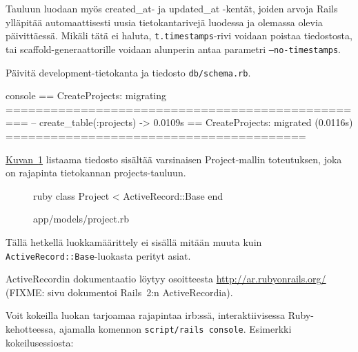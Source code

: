 \documentclass{article}
\newenvironment{myfigure}[1][tbp]{
  \begin{figure}[#1]
    \centering
    \begin{lrbox}{\myfigurebox}
      \begin{minipage}{\textwidth}
}{
      \end{minipage}
    \end{lrbox}
    \colorbox{blue!4}{\usebox{\myfigurebox}}
  \end{figure}
}
\newcommand{\myref}[2]{\hyperref[#2]{#1~\ref*{#2}}}
\begin{document}
Tauluun luodaan myös created\_at- ja updated\_at -kentät, joiden arvoja Rails
ylläpitää automaattisesti uusia tietokantarivejä luodessa ja olemassa olevia
päivittäessä. Mikäli tätä ei haluta, \texttt{t.timestamps}-rivi voidaan poistaa
tiedostosta, tai scaffold-generaattorille voidaan alunperin antaa parametri
\texttt{--no-timestamps}.

\begin{samepage}
Päivitä development-tietokanta ja tiedosto \texttt{db/schema.rb}.

\begin{pygmented}{console}
==  CreateProjects: migrating =================================================
-- create_table(:projects)
   -> 0.0109s
==  CreateProjects: migrated (0.0116s) ========================================
\end{pygmented}
\end{samepage}

\begin{samepage}
\myref{Kuvan}{fig:project-model-00} listaama tiedosto sisältää varsinaisen
Project-mallin toteutuksen, joka on rajapinta tietokannan projects-tauluun.

\begin{myfigure}[H]
\caption{app/models/project.rb}
\label{fig:project-model-00}

\begin{pygmented}{ruby}
class Project < ActiveRecord::Base
end
\end{pygmented}
\end{myfigure}
\end{samepage}

Tällä hetkellä luokkamäärittely ei sisällä mitään muuta kuin
\texttt{ActiveRecord::Base}-luokasta perityt asiat.

ActiveRecordin dokumentaatio löytyy osoitteesta
\url{http://ar.rubyonrails.org/} (FIXME: sivu dokumentoi Rails~2:n
ActiveRecordia).

Voit kokeilla luokan tarjoamaa rajapintaa irb:ssä, interaktiivisessa
Ruby-kehotteessa, ajamalla komennon \texttt{script/rails console}. Esimerkki
kokeilusessiosta:
\end{document}
